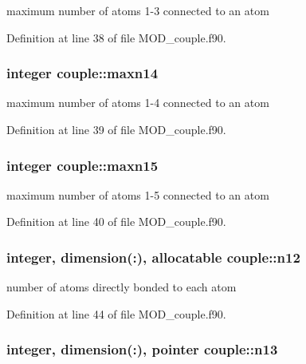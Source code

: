 maximum number of atoms 1-\/3 connected to an atom 



Definition at line 38 of file M\-O\-D\-\_\-couple.\-f90.

\hypertarget{classcouple_a6bbc2e8cd4cc6c99d894b1a7f1836a5c}{
\subsubsection[{maxn14}]{\setlength{\rightskip}{0pt plus 5cm}integer couple\-::maxn14}}\label{classcouple_a6bbc2e8cd4cc6c99d894b1a7f1836a5c}


maximum number of atoms 1-\/4 connected to an atom 



Definition at line 39 of file M\-O\-D\-\_\-couple.\-f90.

\hypertarget{classcouple_a8331c931feb69d1344b060e56c39ffc0}{
\subsubsection[{maxn15}]{\setlength{\rightskip}{0pt plus 5cm}integer couple\-::maxn15}}\label{classcouple_a8331c931feb69d1344b060e56c39ffc0}


maximum number of atoms 1-\/5 connected to an atom 



Definition at line 40 of file M\-O\-D\-\_\-couple.\-f90.

\hypertarget{classcouple_a2025c182a6107594cd04f5d91f893277}{
\subsubsection[{n12}]{\setlength{\rightskip}{0pt plus 5cm}integer, dimension(\-:), allocatable couple\-::n12}}\label{classcouple_a2025c182a6107594cd04f5d91f893277}


number of atoms directly bonded to each atom 



Definition at line 44 of file M\-O\-D\-\_\-couple.\-f90.

\hypertarget{classcouple_a21ee5069565c0019cc91f6ced7ffe92d}{
\subsubsection[{n13}]{\setlength{\rightskip}{0pt plus 5cm}integer, dimension(\-:), pointer couple\-::n13}}\label{classcouple_a21ee5069565c0019cc91f6ced7ffe92d}


